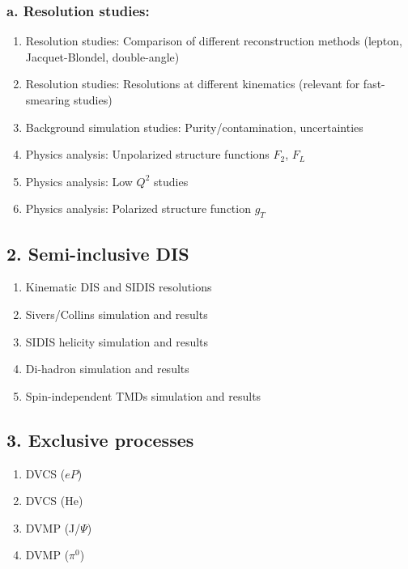 \documentclass{report}
\begin{document}
\subsubsection{a. Resolution studies:}
\begin{enumerate}
    \item Resolution studies: Comparison of different reconstruction methods (lepton, Jacquet-Blondel, double-angle)
    \item Resolution studies: Resolutions at different kinematics (relevant for fast-smearing studies)
    \item Background simulation studies: Purity/contamination, uncertainties
    \item Physics analysis: Unpolarized structure functions $F_2$, $F_L$
    \item Physics analysis: Low $Q^2$ studies
    \item Physics analysis: Polarized structure function $g_T$
\end{enumerate}
\subsection{2. Semi-inclusive DIS}
\begin{enumerate}
    \item Kinematic DIS and SIDIS resolutions
    \item Sivers/Collins simulation and results
    \item SIDIS helicity simulation and results
    \item Di-hadron simulation and results
    \item Spin-independent TMDs simulation and results
\end{enumerate}
\subsection{3. Exclusive processes} 
\begin{enumerate}
    \item DVCS ($eP$)
    \item DVCS (He)
    \item DVMP (J/$\Psi$)
    \item DVMP ($\pi^0$)
\end{enumerate}
\end{document}
